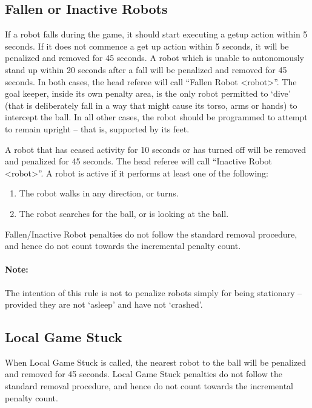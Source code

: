 \documentclass[12pt]{article}
\begin{document}
\subsection{Fallen or Inactive Robots}
\label{sec:fallenrobots}

If a robot falls during the game, it should start executing a getup action within 5 seconds. If it does not commence a get up action within 5 seconds, it will be penalized and removed for 45 seconds.
A robot which is unable to autonomously stand up within 20 seconds after a fall will be penalized and removed for 45 seconds.
In both cases, the head referee will call ``Fallen Robot  \textless robot\textgreater''.
The goal keeper, inside its own penalty area, is the only robot permitted to `dive' (that is deliberately fall in a way that might cause its torso, arms or hands) to intercept the ball. In all other cases, the robot should be programmed to attempt to remain upright -- that is, supported by its feet.

A robot that has ceased activity for 10 seconds or has turned off will be removed and penalized for 45 seconds.
The head referee will call ``Inactive Robot  \textless robot\textgreater''.
A robot is active if it performs at least one of the following:
\begin{enumerate}
  \item The robot walks in any direction, or turns.
  \item The robot searches for the ball, or is looking at the ball.
\end{enumerate}

Fallen/Inactive Robot penalties do not follow the standard removal procedure, and hence do not count towards the incremental penalty count.

\paragraph{Note:} The intention of this rule is not to penalize robots simply for being stationary -- provided they are not `asleep' and have not `crashed'.

\subsection{Local Game Stuck}
\label{sec:pen_local_game_stuck}

When Local Game Stuck is called, the nearest robot to the ball will be penalized and removed for 45 seconds. Local Game Stuck penalties do not follow the standard removal procedure, and hence do not count towards the incremental penalty count.
\end{document}
